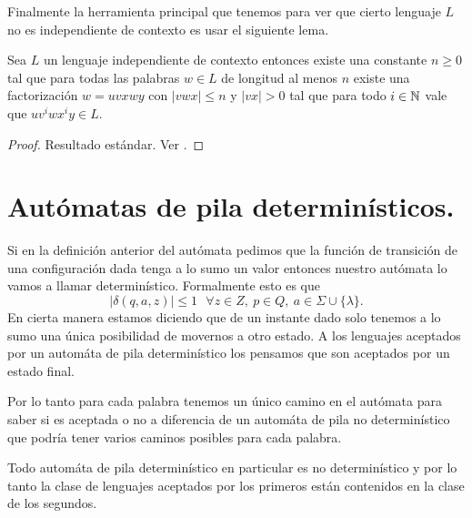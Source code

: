 \documentclass[tesis.tex]{subfiles}
\newcommand{\ic}{independiente de contexto }
\newcommand{\APND}{automáta de pila no determinístico }
\newcommand{\APD}{automáta de pila determinístico }
\begin{document}
Finalmente la herramienta principal que tenemos para ver que cierto lenguaje $L$ no es \ic es usar el siguiente lema.

\begin{lema}[Pumping] \label{pumping}
	Sea $L$ un lenguaje independiente de contexto entonces existe una constante $n \ge 0$ tal que para todas las palabras $w \in L$ de longitud al menos $n$ existe una factorización $w = uvxwy$ con $|vwx| \le n$ y $|vx| > 0$ tal que para todo $i \in \mathbb{N}$ vale que $uv^iwx^iy \in L$.
\end{lema}

\begin{proof}
	Resultado estándar. Ver \cite{hopcraft-ullman}.
\end{proof}

\section{Autómatas de pila determinísticos.} Si en la definición anterior del autómata pedimos que la función de transición de una configuración dada tenga a lo sumo un valor entonces nuestro autómata lo vamos a llamar determinístico. Formalmente esto es que 
\[
|\delta(q,a, z)| \le 1 \ \ \ \forall z \in Z, \ p \in Q, \ a \in \Sigma \cup \{ \lambda \}.
\]
En cierta manera estamos diciendo que de un instante dado solo tenemos a lo sumo una única posibilidad de movernos a otro estado. A los lenguajes aceptados por un \APD los pensamos que son aceptados por un estado final.


 Por lo tanto para cada palabra tenemos un único camino en el autómata para saber si es aceptada o no a diferencia de un \APND  que podría tener varios caminos posibles para cada palabra.
\begin{obs}
	Todo \APD en particular es no determinístico y por lo tanto la clase de lenguajes aceptados por los primeros están contenidos en la clase de los segundos.
\end{obs}
\end{document}
